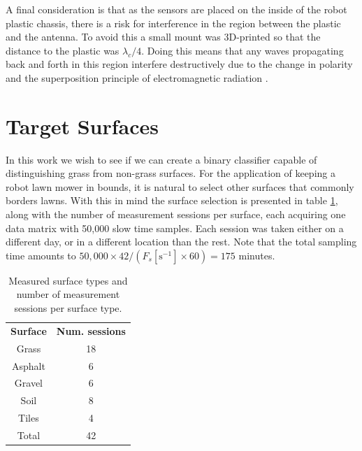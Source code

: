 A final consideration is that as the sensors are placed on the inside of the robot plastic chassis, there is a risk for interference in the region between the plastic and the antenna. To avoid this a small mount was 3D-printed so that the distance to the plastic was $\lambda_c/4$. Doing this means that any waves propagating back and forth in this region interfere destructively due to the change in polarity and the superposition principle of electromagnetic radiation \citep{griffiths_2018}.

\section{Target Surfaces}

In this work we wish to see if we can create a binary classifier capable of distinguishing grass from non-grass surfaces. For the application of keeping a robot lawn mower in bounds, it is natural to select other surfaces that commonly borders lawns. With this in mind the surface selection is presented in table \ref{tab:count}, along with the number of measurement sessions per surface, each acquiring one data matrix with 50,000 slow time samples. Each session was taken either on a different day, or in a different location than the rest. Note that the total sampling time amounts to $50,000\times42/(F_s [\text{s}^{-1}]\times60)=175$ minutes.

\begin{table}
\begin{center}
	\begin{tabular}{|c|c|}
		\hline
		\rowcolor{gray!150}\color{white}\textbf{Surface} & \color{white}\textbf{Num. sessions} \\
		 Grass & 18 \\
		 \rowcolor{gray!25} Asphalt & 6 \\
		 Gravel & 6 \\
		 \rowcolor{gray!25} Soil & 8 \\
		 Tiles & 4 \\ \hline
		 \rowcolor{gray!25} Total & 42 \\
		 \hline
	\end{tabular}
\end{center}
\caption{Measured surface types and number of measurement sessions per surface type.}
\label{tab:count}
\end{table}

